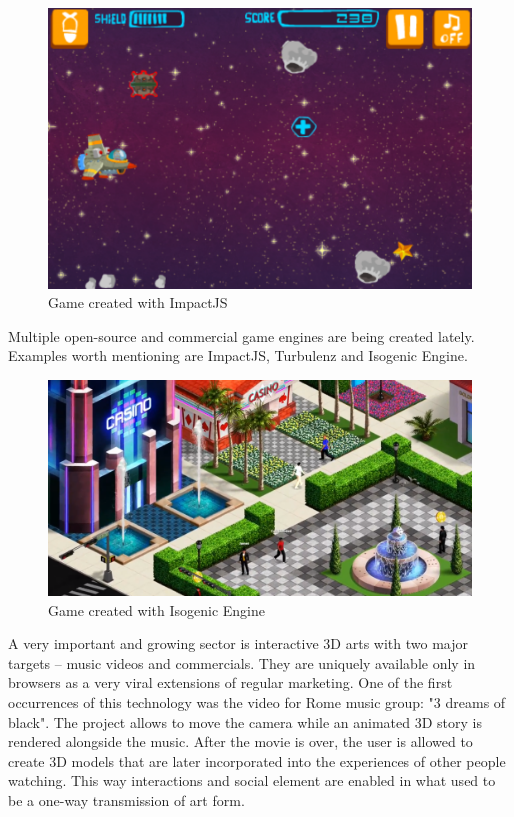 \begin{figure}[h!]
  \caption{Game created with ImpactJS}
  \label{img:impactjs}
  \centering
	\includegraphics[width=12cm]{summary/impactjs.png}
\end{figure}

Multiple open-source and commercial game engines are being created lately. Examples worth mentioning are ImpactJS\cite{impactjs}, Turbulenz\cite{turbulenz} and Isogenic Engine\cite{isogenicengine}.


\begin{figure}[h!]
  \caption{Game created with Isogenic Engine}
  \label{img:isogenic}
  \centering
	\includegraphics[width=12cm]{summary/isogenic.png}
\end{figure}

A very important and growing sector is interactive 3D arts with two major targets -- music videos and commercials. They are uniquely available only in browsers as a very viral extensions of regular marketing. One of the first occurrences of this technology was the video for Rome music group: "3 dreams of black"\cite{rome}. The project allows to move the camera while an animated 3D story is rendered alongside the music. After the movie is over, the user is allowed to create 3D models that are later incorporated into the experiences of other people watching. This way interactions and social element are enabled in what used to be a one-way transmission of art form.


